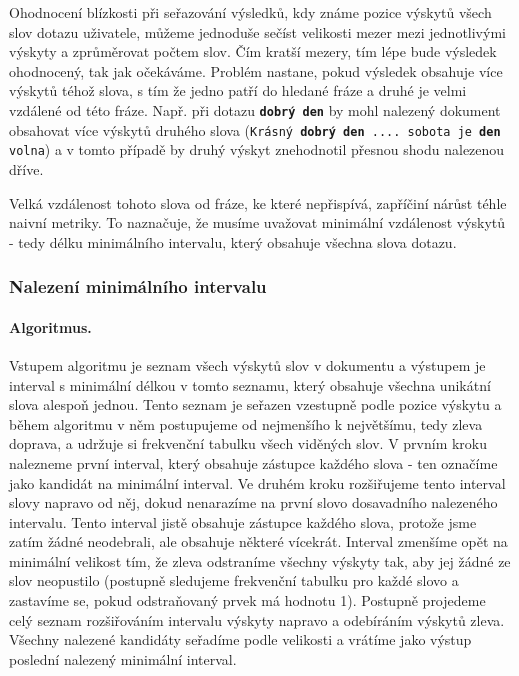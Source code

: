 \documentclass[11pt,letterpaper,oneside,openright]{book}
\newcommand{\bftt}[1]{\texttt{\textbf{#1}}}
\begin{document}
Ohodnocení blízkosti při seřazování výsledků, kdy známe pozice výskytů všech
slov dotazu uživatele, můžeme jednoduše sečíst velikosti mezer mezi
jednotlivými výskyty a zprůměrovat počtem slov. Čím kratší mezery, tím lépe
bude výsledek ohodnocený, tak jak očekáváme. Problém nastane, pokud výsledek
obsahuje více výskytů téhož slova, s tím že jedno patří do hledané fráze a
druhé je velmi vzdálené od této fráze. Např. při dotazu \bftt{dobrý den} by
mohl nalezený dokument obsahovat více výskytů druhého slova (\texttt{Krásný
\bftt{dobrý den} .... sobota je \bftt{den} volna}) a v tomto případě by druhý
výskyt znehodnotil přesnou shodu nalezenou dříve.

Velká vzdálenost tohoto slova od fráze, ke které nepřispívá, zapříčiní nárůst
téhle naivní metriky. To naznačuje, že musíme uvažovat minimální vzdálenost
výskytů - tedy délku minimálního intervalu, který obsahuje všechna slova
dotazu.

\subsubsection{Nalezení minimálního intervalu} \label{sec:find_minimal_interval}
\paragraph{Algoritmus.} Vstupem algoritmu je seznam všech výskytů slov v
dokumentu a výstupem je interval s minimální délkou v tomto seznamu, který
obsahuje všechna unikátní slova alespoň jednou. Tento seznam je seřazen
vzestupně podle pozice výskytu a během algoritmu v něm postupujeme od
nejmenšího k největšímu, tedy zleva doprava, a udržuje si frekvenční tabulku
všech viděných slov.  V prvním kroku nalezneme první interval, který obsahuje
zástupce každého slova - ten označíme jako kandidát na minimální interval. Ve
druhém kroku rozšiřujeme tento interval slovy napravo od něj, dokud nenarazíme
na první slovo dosavadního nalezeného intervalu. Tento interval jistě obsahuje
zástupce každého slova, protože jsme zatím žádné neodebrali, ale obsahuje
některé vícekrát. Interval zmenšíme opět na minimální velikost tím, že zleva
odstraníme všechny výskyty tak, aby jej žádné ze slov neopustilo (postupně
sledujeme frekvenční tabulku pro každé slovo a zastavíme se, pokud odstraňovaný
prvek má hodnotu 1). Postupně projedeme celý seznam rozšiřováním intervalu
výskyty napravo a odebíráním výskytů zleva. Všechny nalezené kandidáty seřadíme
podle velikosti a vrátíme jako výstup poslední nalezený minimální interval.
\end{document}
